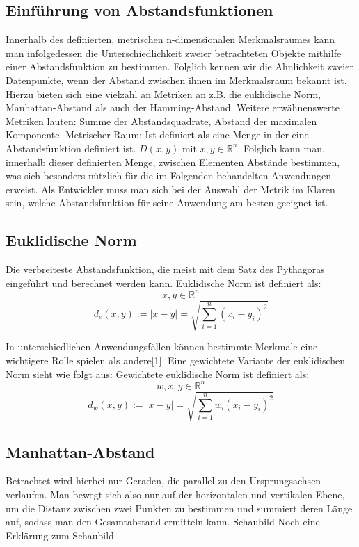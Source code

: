\documentclass[a4paper]{scrartcl}
\begin{document}
\begin{multicols}{2}
                        \subsection{Einführung von Abstandsfunktionen}
                        Innerhalb des definierten, metrischen n-dimensionalen Merkmalsraumes kann man infolgedessen die Unterschiedlichkeit zweier betrachteten Objekte mithilfe einer Abstandsfunktion zu bestimmen. Folglich kennen wir die Ähnlichkeit zweier Datenpunkte, wenn der Abstand zwischen ihnen im Merkmalsraum bekannt ist. Hierzu bieten sich eine vielzahl an Metriken an z.B. die euklidische Norm, Manhattan-Abstand als auch der Hamming-Abstand. Weitere erwähnenswerte Metriken lauten: Summe der Abstandsquadrate, Abstand der maximalen Komponente. 
                        Metrischer Raum: Ist definiert als eine Menge in der eine Abstandsfunktion definiert ist.
                        $D(x,y)$ mit $x,y \in \mathbb{R}^n$.
                        Folglich kann man, innerhalb dieser definierten Menge, zwischen Elementen Abstände bestimmen, was sich besonders nützlich für die im Folgenden behandelten Anwendungen erweist.
                        Als Entwickler muss man sich bei der Auswahl der Metrik im Klaren sein, welche Abstandsfunktion für seine Anwendung am besten geeignet ist. 
                        \subsection{Euklidische Norm}
                            Die verbreiteste Abstandsfunktion, die meist mit dem Satz des Pythagoras eingeführt und berechnet werden kann.
                            Euklidische Norm ist definiert als:
	                        $$ x,y \in \mathbb{R}^n $$
	                        $$d_e(x,y):= |x - y| = \sqrt{\sum_{i=1}^{n}(x_i -y_i)^2} $$
                        
                        In unterschiedlichen Anwendungsfällen können bestimmte Merkmale eine wichtigere Rolle spielen als andere[1]. Eine gewichtete Variante der euklidischen Norm sieht wie folgt aus:
                        Gewichtete euklidische Norm ist definiert als:
                            $$w,x,y \in \mathbb{R}^n $$
                            $$d_w(x,y):= |x - y| = \sqrt{\sum_{i=1}^{n}w_i(x_i -y_i)^2}$$
                         
                    \subsection{Manhattan-Abstand}
                        Betrachtet wird hierbei nur Geraden, die parallel zu den Ursprungsachsen verlaufen. Man bewegt sich also nur auf der horizontalen und vertikalen Ebene, um die Distanz zwischen zwei Punkten zu bestimmen und summiert deren Länge auf, sodass man den Gesamtabstand ermitteln kann.
                        Schaubild
                        Noch eine Erklärung zum Schaubild


\end{multicols}
\end{document}
